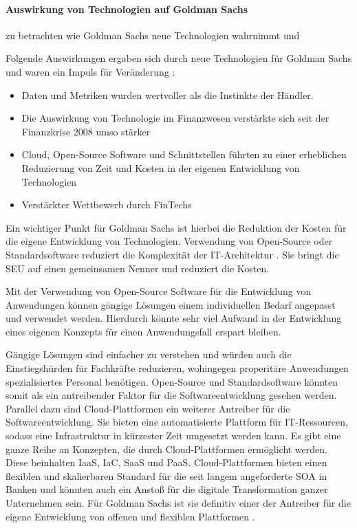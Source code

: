 \paragraph{Auswirkung von Technologien auf Goldman Sachs}
 zu betrachten wie Goldman Sachs neue Technologien wahrnimmt und 

Folgende Auswirkungen ergaben sich durch neue Technologien für Goldman Sachs und waren ein Impuls für Veränderung \cite{Gupta:2017}:
\begin{itemize}
    \item Daten und Metriken wurden wertvoller als die Instinkte der Händler.
    \item Die Auswirkung von Technologie im Finanzwesen verstärkte sich seit der Finanzkrise 2008 umso stärker
    \item Cloud, Open-Source Software und Schnittstellen führten zu einer erheblichen Reduzierung von Zeit und Kosten in der eigenen Entwicklung von Technologien
    \item Verstärkter Wettbewerb durch FinTechs
\end{itemize}

Ein wichtiger Punkt für Goldman Sachs ist hierbei die Reduktion der Kosten für die eigene Entwicklung von Technologien. Verwendung von Open-Source oder Standardsoftware reduziert die Komplexität der IT-Architektur \cite{Bussmann2006}. Sie bringt die \ac{SEU} auf einen gemeinsamen Nenner und reduziert die Kosten. 

Mit der Verwendung von Open-Source Software für die Entwicklung von Anwendungen können gängige Lösungen einem individuellen Bedarf angepasst und verwendet werden. Hierdurch könnte sehr viel Aufwand in der Entwicklung eines eigenen Konzepts für einen Anwendungsfall erspart bleiben.

Gängige Lösungen sind einfacher zu verstehen und würden auch die Einstiegshürden für Fachkräfte reduzieren, wohingegen properitäre Anwendungen spezialisiertes Personal benötigen. Open-Source und Standardsoftware könnten somit als ein antreibender Faktor für die Softwareentwicklung gesehen werden.
\medskip
\\
Parallel dazu sind Cloud-Plattformen ein weiterer Antreiber für die Softwareentwicklung. Sie bieten eine automatisierte Plattform für IT-Ressourcen, sodass eine Infrastruktur in kürzester Zeit umgesetzt werden kann. Es gibt eine ganze Reihe an Konzepten, die durch Cloud-Plattformen ermöglicht werden. Diese beinhalten \ac{IaaS}, \ac{IaC}, \ac{SaaS} und \ac{PaaS}.
Cloud-Plattformen bieten einen flexiblen und skalierbaren Standard für die seit langem angeforderte \ac{SOA} \cite{Brockhoff2006} in Banken und könnten auch ein Anstoß für die digitale Transformation ganzer Unternehmen sein. Für Goldman Sachs ist sie definitiv einer der Antreiber für die eigene Entwicklung von offenen und flexiblen Plattformen \cite{Gupta:2017}.
%
